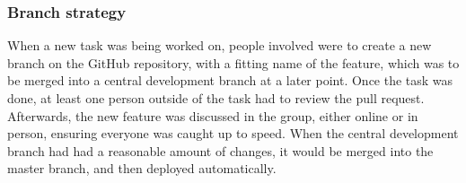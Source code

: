 \subsubsection{Branch strategy}
When a new task was being worked on, people involved were to create a new branch on the GitHub repository, with a fitting name of the feature, which was to be merged into a central development branch at a later point. Once the task was done, at least one person outside of the task had to review the pull request. Afterwards, the new feature was discussed in the group, either online or in person, ensuring everyone was caught up to speed. When the central development branch had had a reasonable amount of changes, it would be merged into the master branch, and then deployed automatically.